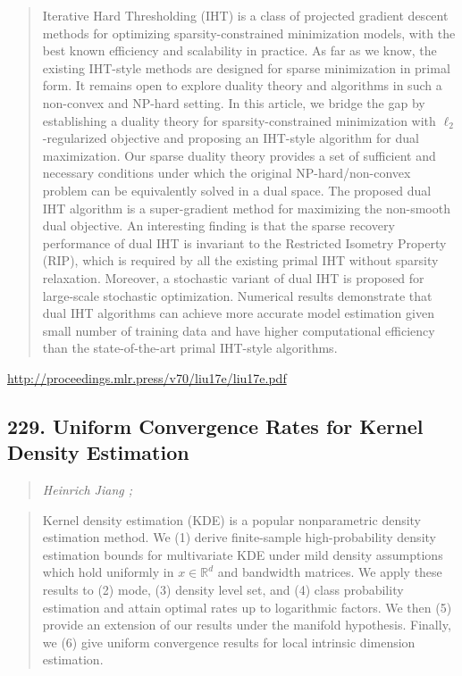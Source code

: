 \documentclass{article}
\begin{document}
\begin{quote}
    Iterative Hard Thresholding (IHT) is a class of projected gradient descent methods for optimizing sparsity-constrained minimization models, with the best known efficiency and scalability in practice. As far as we know, the existing IHT-style methods are designed for sparse minimization in primal form. It remains open to explore duality theory and algorithms in such a non-convex and NP-hard setting. In this article, we bridge the gap by establishing a duality theory for sparsity-constrained minimization with $\ell_2$-regularized objective and proposing an IHT-style algorithm for dual maximization. Our sparse duality theory provides a set of sufficient and necessary conditions under which the original NP-hard/non-convex problem can be equivalently solved in a dual space. The proposed dual IHT algorithm is a super-gradient method for maximizing the non-smooth dual objective. An interesting finding is that the sparse recovery performance of dual IHT is invariant to the Restricted Isometry Property (RIP), which is required by all the existing primal IHT without sparsity relaxation. Moreover, a stochastic variant of dual IHT is proposed for large-scale stochastic optimization. Numerical results demonstrate that dual IHT algorithms can achieve more accurate model estimation given small number of training data and have higher computational efficiency than the state-of-the-art primal IHT-style algorithms.  
\end{quote}

\href{http://proceedings.mlr.press/v70/liu17e/liu17e.pdf}{http://proceedings.mlr.press/v70/liu17e/liu17e.pdf}

\subsection{229. Uniform Convergence Rates for Kernel Density Estimation}

\begin{quote}
\footnotesize{\textit{Heinrich Jiang ;}}

\end{quote}

\begin{quote}
    Kernel density estimation (KDE) is a popular nonparametric density estimation method. We (1) derive finite-sample high-probability density estimation bounds for multivariate KDE under mild density assumptions which hold uniformly in $x \in \mathbb{R}^d$ and bandwidth matrices. We apply these results to (2) mode, (3) density level set, and (4) class probability estimation and attain optimal rates up to logarithmic factors. We then (5) provide an extension of our results under the manifold hypothesis. Finally, we (6) give uniform convergence results for local intrinsic dimension estimation.  
\end{quote}
\end{document}
